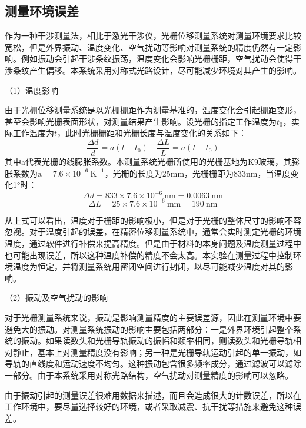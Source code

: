 \documentclass[type=master,oneside]{fduthesis}
\begin{document}
\subsection{测量环境误差}
作为一种干涉测量法，相比于激光干涉仪，光栅位移测量系统对测量环境要求比较宽松，但是外界振动、温度变化、空气扰动等影响对测量系统的精度仍然有一定影响。例如振动会引起干涉条纹振荡，温度变化会影响光栅栅距，空气扰动会使得干涉条纹产生偏移。本系统采用对称式光路设计，尽可能减少环境对其产生的影响。

（1）温度影响

由于光栅位移测量系统是以光栅栅距作为测量基准的，温度变化会引起栅距变形，甚至会影响光栅表面形状，对测量结果产生影响。设光栅的指定工作温度为$t_{0}$，实际工作温度为$t$，此时光栅栅距和光栅长度与温度变化的关系如下：
\begin{equation}
  \frac{\Delta d}{d}=a\left(t-t_{0}\right) \quad \frac{\Delta L}{L}=a\left(t-t_{0}\right)
\end{equation}
其中a代表光栅的线膨胀系数。本测量系统光栅所使用的光栅基地为K9玻璃，其膨胀系数为$\mathrm{a}=7.6 \times 10^{-6} \mathrm{~K}^{-1}$，光栅的长度为25mm，光栅栅距为833nm，当温度变化1°时：
\begin{equation}
  \Delta d=833 \times 7.6 \times 10^{-6} \mathrm{~nm}=0.0063 \mathrm{~nm}
\end{equation}
\begin{equation}
  \Delta L=25 \times 7.6 \times 10^{-6} \mathrm{~mm}=190 \mathrm{~nm}
\end{equation}

从上式可以看出，温度对于栅距的影响极小，但是对于光栅的整体尺寸的影响不容忽视。对于温度引起的误差，在精密位移测量系统中，通常会实时测定光栅的环境温度，通过软件进行补偿来提高精度。但是由于材料的本身问题及温度测量过程中也可能出现误差，所以这种温度补偿的精度不会太高。本实验在测量过程中控制环境温度为恒定，并将测量系统用密闭空间进行封闭，以尽可能减少温度对其的影响。

（2）振动及空气扰动的影响

对于光栅测量系统来说，振动是影响测量精度的主要误差源，因此在测量环境中要避免大的振动。对测量系统振动的影响主要包括两部分：一是外界环境引起整个系统的振动。如果读数头和光栅导轨振动的振幅和频率相同，则读数头和光栅导轨相对静止，基本上对测量精度没有影响；另一种是光栅导轨运动引起的单一振动，如导轨的直线度和运动速度不均匀。这种振动包含很多频率成分，通过滤波可以滤除一部分。由于本系统采用对称光路结构，空气扰动对测量精度的影响可以忽略。

由于振动引起的测量误差很难用数据来描述，而且会造成很大的计数误差，所以在工作环境中，要尽量选择较好的环境，或者采取减震、抗干扰等措施来避免这种误差。
\end{document}

